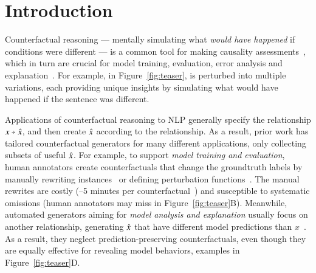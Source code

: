 \section{Introduction}
\label{sec:intro}



Counterfactual reasoning --- mentally simulating what \emph{would have happened} if conditions were different --- is a common tool for making causality assessments~\cite{kahneman}, which in turn are crucial for model training, evaluation, error analysis and explanation~\cite{miller}. 
For example, in Figure~\ref{fig:teaser},  is perturbed into multiple variations, each providing unique insights by simulating what would have happened if the sentence was different.

Applications of counterfactual reasoning to NLP generally specify the relationship $x \veryshortarrow \xp$, and then create $\hat{x}$ according to the relationship.
As a result, prior work has tailored counterfactual generators for many different applications, only collecting subsets of useful $\hat{x}$.
For example, to support {\em model training and evaluation}, human annotators create counterfactuals that change the groundtruth labels by manually rewriting instances~\cite{gardner2020contrast} or defining perturbation functions~\cite{checklist:acl20}.
The manual rewrites are costly (--5 minutes per counterfactual~\cite{kaushik2019learning}) and susceptible to systematic omissions (\eg human annotators may miss  in Figure~\ref{fig:teaser}B).
Meanwhile, automated generators aiming for \emph{model analysis and explanation} usually focus on another relationship, \ie generating $\hat{x}$ that have different model predictions than $x$~\cite{ross2020explaining, Zhang2019GeneratingFA}. 
As a result, they neglect prediction-preserving counterfactuals, even though they are equally effective for revealing model behaviors, \eg examples in Figure~\ref{fig:teaser}D.


